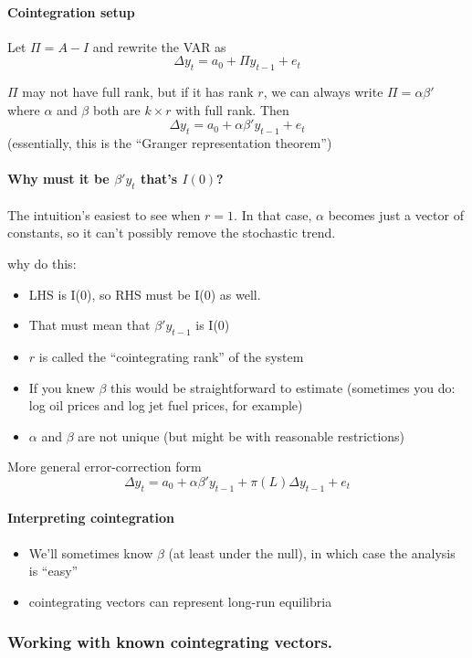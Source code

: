 \paragraph{Cointegration setup}
Let $\Pi = A - I$ and rewrite the VAR as
\[\Delta  y_t = a_0 + \Pi y_{t-1} + e_t\]

$\Pi$ may not have full rank, but if it has rank $r$, we can always write $\Pi =
\alpha\beta'$ where $\alpha$ and $\beta$ both are $k × r$ with full rank.
Then \[\Delta y_t = a_0 + \alpha\beta'y_{t-1} + e_t\]
(essentially, this is the ``Granger representation theorem'')

\paragraph{Why must it be $\beta'y_t$ that's $I(0)$?} The intuition's
easiest to see when $r=1$.  In that case, $\alpha$ becomes just a vector of
constants, so it can't possibly remove the stochastic trend.

why do this:
\begin{itemize}
\item LHS is I(0), so RHS must be I(0) as well.
\item That must mean that $\beta'y_{t-1}$ is I(0)
\item $r$ is called the ``cointegrating rank'' of the system
\item If you knew $\beta$ this would be straightforward to estimate
  (sometimes you do: log oil prices and log jet fuel prices, for
  example)
\item $\alpha$ and $\beta$ are not unique (but might be with reasonable
  restrictions)
\end{itemize}

More general error-correction form
\[\Delta  y_t = a_0 + \alpha\beta' y_{t-1} + \pi(L) \Delta  y_{t-1} + e_t\]

\paragraph{Interpreting cointegration}
\begin{itemize}
\item We'll sometimes know $\beta$ (at least under the null), in which
  case the analysis is ``easy''
\item cointegrating vectors can represent long-run equilibria
\end{itemize}

\subsubsection{Working with known cointegrating vectors.}

